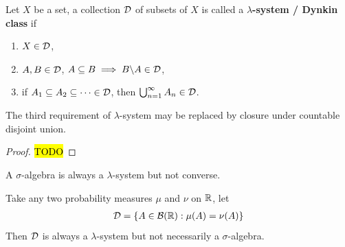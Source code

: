 \documentclass[11pt]{article}
\begin{document}
	\begin{definition}
		Let $X$ be a set, a collection $\mathcal{{D}}$ of subsets of $X$ is called a \textbf{$\lambda$-system / Dynkin class} if 
		\begin{enumerate}
			\item $X \in \mathcal{{D}}$,
			\item $A, B \in \mathcal{{D}}$, $A \subseteq B \implies B \backslash A \in \mathcal{{D}}$,
			\item if $A_1 \subseteq A_2 \subseteq \dots \in \mathcal{{D}}$, then $\bigcup_{n=1}^\infty A_n \in \mathcal{{D}}$.
		\end{enumerate}
	\end{definition}
	
	\begin{remark}
		The third requirement of $\lambda$-system may be replaced by closure under countable disjoint union.
		\begin{proof}
			\hl{TODO}
		\end{proof}
	\end{remark}
	
	\begin{remark}
		A $\sigma$-algebra is always a $\lambda$-system but not converse.
	\end{remark}
	
	\begin{example}
		Take any two probability measures $\mu$ and $\nu$ on $\mathbb{R}$, let
		\begin{align}
			\mathcal{{D}} = \{A \in \mathcal{{B}}(\mathbb{R}) : \mu(A) = \nu(A)\}	
		\end{align}
		Then $\mathcal{{D}}$ is always a $\lambda$-system but not necessarily a $\sigma$-algebra.
	\end{example}
	
\end{document}
